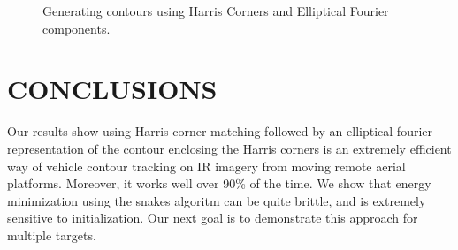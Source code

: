 \documentclass{article}
\begin{document}
			\begin{figure}[t]
						\centering
			
						\caption{Generating contours using Harris Corners and Elliptical Fourier components.} 	
						\label{fig:Contours}	
			\end{figure}

\section{CONCLUSIONS}
Our results show using Harris corner matching followed by an elliptical fourier representation of the contour enclosing the Harris corners is an extremely efficient way of vehicle contour tracking on IR imagery from moving remote aerial platforms.  Moreover, it works well over 90\% of the time.  We show that energy minimization using the snakes algoritm can be quite brittle, and is extremely sensitive to initialization.  Our next goal is to demonstrate this approach for multiple targets.


 
\end{document}
